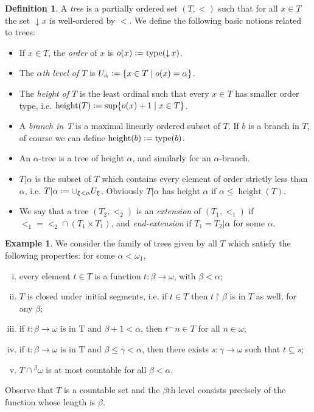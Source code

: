 \documentclass[12pt,a4paper]{report}
\theoremstyle{definition}
\newtheorem{defn}[theorem]{Definition}
\newtheorem{example}[theorem]{Example}
\theoremstyle{num.custom-title}
\DeclareMathOperator{\sse}{\subseteq}
\DeclareMathOperator{\type}{type}
\DeclareMathOperator{\height}{height}
\DeclareMathOperator{\restr}{\upharpoonright}
\DeclareMathOperator{\down}{\downarrow}
\newcommand{\conc}{^\frown}
\newcommand*{\defeq}{\mathrel{\rlap{%
                     \raisebox{0.3ex}{$\cdot$}}%
                     \raisebox{-0.3ex}{$\cdot$}}%
                     =}
\begin{document}
\begin{defn}
A \emph{tree} is a partially ordered set $(T,<)$ such that for all $x \in T$ the set $\down x$ is well-ordered by $<$. We define the following basic notions related to trees:
\begin{itemize}
\item If $x \in T$, the \emph{order} of $x$ is $o(x) \defeq \type(\down x)$.
\item The \emph{$\alpha$th level of $T$} is $U_\alpha \defeq \{x \in T \mid o(x)=\alpha\}$.
\item The \emph{height of $T$} is the least ordinal such that every $x \in T$ has smaller order type, i.e. $\height(T) \defeq \sup\{o(x)+1 \mid x \in T\}$.
\item A \emph{branch in T} is a maximal linearly ordered subset of $T$. If $b$ is a branch in $T$, of course we can define $\height(b) \defeq \type(b)$.
\item An $\alpha$-tree is a tree of height $\alpha$, and similarly for an $\alpha$-branch.
\item $T|\alpha$ is the subset of $T$ which contains every element of order strictly less than $\alpha$, i.e. $T|\alpha \defeq \cup_{\xi < \alpha} U_\xi$. Obviously $T|\alpha$ has height $\alpha$ if $\alpha \leq \height(T)$.
\item We say that a tree $(T_2,<_2)$ is an \emph{extension} of $(T_1,<_1)$ if ${<_1} = {<_2} \cap (T_1 \times T_1)$, and \emph{end-extension} if $T_1=T_2|\alpha$ for some $\alpha$.
\end{itemize}
\end{defn}

\begin{example}
We consider the family of trees given by all $T$ which satisfy the following properties: for some $\alpha < \omega_1$,
\begin{enumerate}[(i)]
\item every element $t \in T$ is a function $t \colon \beta \to \omega$, with $\beta < \alpha$;
\item $T$ is closed under initial segments, i.e. if $t \in T$ then $t \restr \beta$ is in $T$ as well, for any $\beta$;
\item if $t \colon \beta \to \omega$ is in T and $\beta+1 < \alpha$, then $t \conc n \in T$ for all $n \in \omega$;
\item if $t \colon \beta \to \omega$ is in T and $\beta \leq \gamma < \alpha$, then there exists $s \colon \gamma \to \omega$ such that $t \sse s$;
\item $T \cap {}^{\beta} \omega$ is at most countable for all $\beta < \alpha$.
\end{enumerate}
Observe that $T$ is a countable set and the $\beta$th level consists precisely of the function whose length is $\beta$.
\end{example}
\end{document}
